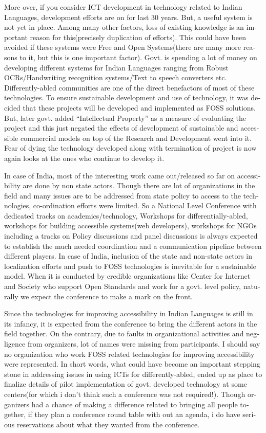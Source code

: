 \begin{english}
More over, if you consider ICT development in technology related to Indian Languages, development efforts are on for last 30 years. But, a useful system is not yet in place. Among many other factors, loss of existing knowledge is an important reason for this(precisely duplication of efforts). This could have been avoided if these systems were Free and Open Systems(there are many more reasons to it, but this is one important factor). Govt. is spending a lot of money on developing different systems for Indian Languages ranging from Robust OCRs/Handwriting recognition systems/Text to speech converters etc. Differently-abled communities are one of the direct benefactors of most of these technologies. To ensure sustainable development and use of technology, it was decided that these projects will be developed and implemented as FOSS solutions. But, later govt. added “Intellectual Property” as a measure of evaluating the project and this just negated the effects of development of sustainable and accessible commercial models on top of the Research and Development went into it. Fear of dying the technology developed along with termination of project is now again looks at the ones who continue to develop it.

In case of India, most of the interesting work came out/released so far on accessibility are done by non state actors. Though there are lot of organizations in the field and many issues are to be addressed from state policy to access to the technologies, co-ordination efforts were limited. So a National Level Conference with dedicated tracks on academics/technology, Workshops for differentially-abled, workshops for building accessible systems(web developers), workshops for NGOs including a tracks on Policy discussions and panel discussions is always expected to establish the much needed coordination and a communication pipeline between different players. In case of India, inclusion of the state and non-state actors in localization efforts and push to FOSS technologies is inevitable for a sustainable model. When it is conducted by credible organizations like Center for Internet and Society who support Open Standards and work for a govt. level policy, naturally we expect the conference to make a mark on the front.

Since the technologies for improving accessibility in Indian Languages is still in its infancy, it is expected from the conference to bring the different actors in the field together. On the contrary, due to faults in organizational activities and negligence from organizers, lot of names were missing from participants. I should say no organization who work FOSS related technologies for improving accessibility were represented. In short words, what could have become an important stepping stone in addressing issues in using ICTs for differently-abled, ended up as place to finalize details of pilot implementation of govt. developed technology at some centers(for which i don’t think such a conference was not required!). Though organizers had a chance of making a difference related to bringing all people together, if they plan a conference round table with out an agenda, i do have serious reservations about what they wanted from the conference.


\end{english}
